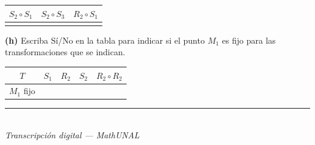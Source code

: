 \documentclass[11pt]{article}
\newcommand{\ptsbox}[1]{\fboxsep=3pt\fbox{\footnotesize #1}\hspace{4pt}}
\newcommand{\examfooter}{%
  \vfill
  \rule{\linewidth}{0.4pt}\\[1pt]
  {\scriptsize\textit{Transcripción digital --- MathUNAL}\hfill\textcolor{unalblue}{\textbf{\thepage}}}
}
\begin{document}
\begin{enumerate}
\begin{minipage}[t]{0.47\linewidth}
\vspace{6pt}
\begin{tabular}{|c|c|c|}
\hline
$S_2\circ S_1$ & $S_2\circ S_3$ & $R_2\circ S_1$\\
\hline
 & & \\[8pt]
\hline
\end{tabular}
\end{minipage}%
\hfill
\begin{minipage}[t]{0.47\linewidth}
\ptsbox{4pt} \textbf{(h)} Escriba Sí/No en la tabla para indicar si el punto $M_1$ es fijo para las transformaciones que se indican.

\vspace{6pt}
\begin{tabular}{|c|c|c|c|c|}
\hline
$T$ & $S_1$ & $R_2$ & $S_2$ & $R_2\circ R_2$\\
\hline
$M_1$ fijo & & & & \\[6pt]
\hline
\end{tabular}
\end{minipage}

\end{enumerate}

\examfooter
\end{document}
